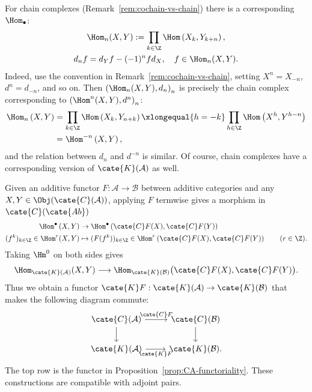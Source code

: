 \begin{remark}
	\label{rem:Hom-chain-cplx}
	For chain complexes (Remark~\ref{rem:cochain-vs-chain}) there is a
	corresponding $\Hom_\bullet$:
	\begin{gather*}
		\Hom_n(X, Y) := \prod_{k \in \Z} \Hom\left(X_k, Y_{k+n} \right), \\
		d_n f = d_Y f - (-1)^n f d_X, \quad f \in \Hom_n(X, Y).
	\end{gather*}
	Indeed, use the convention in Remark~\ref{rem:cochain-vs-chain}, setting
	$X^n=X_{-n}$, $d^n=d_{-n}$, and so on. Then
	$\left(\Hom_n(X,Y),d_n\right)_n$ is precisely the chain complex
	corresponding to $\left(\Hom^n(X,Y),d^n\right)_n$:
	\begin{align*}
		\Hom_n\left(X, Y \right) & = \prod_{k \in \Z} \Hom\left( X_k, Y_{n+k} \right) \xlongequal{h = -k} \prod_{h \in \Z} \Hom\left(X^h, Y^{h-n} \right) \\
		& = \Hom^{-n} \left(X, Y\right),
	\end{align*}
	and the relation between $d_n$ and $d^{-n}$ is similar. Of course, chain
	complexes have a corresponding version of $\cate{K}(\mathcal{A})$ as
	well.
\end{remark}

Given an additive functor $F:\mathcal{A}\to\mathcal{B}$ between additive
categories and any $X,Y\in\Obj(\cate{C}(\mathcal{A}))$, applying $F$
termwise gives a morphism in $\cate{C}(\cate{Ab})$
\begin{align*}
	\Hom^\bullet\left(X, Y\right) & \to \Hom^\bullet\left(\cate{C}F(X), \cate{C}F(Y) \right) \\
	(f^k)_{k \in \Z}\in\Hom^r(X,Y) & \mapsto
	(F(f^k))_{k \in \Z}\in
	\Hom^r\left(\cate{C}F(X),\cate{C}F(Y)\right) \qquad (r\in\Z).
\end{align*}
Taking $\Hm^0$ on both sides gives
\[
	\Hom_{\cate{K}(\mathcal{A})}(X,Y)\longrightarrow
	\Hom_{\cate{K}(\mathcal{B})}
	\bigl(\cate{C}F(X),\cate{C}F(Y)\bigr).
\]
Thus we obtain a functor $\cate{K}F:\cate{K}(\mathcal{A})\to
\cate{K}(\mathcal{B})$ that makes the following diagram commute:
\begin{equation}\label{eqn:KF}\begin{tikzcd}
	\cate{C}(\mathcal{A}) \arrow[r, "{\cate{C}F}"] \arrow[d] & \cate{C}(\mathcal{B}) \arrow[d] \\
	\cate{K}(\mathcal{A}) \arrow[r, "{\cate{K}F}"'] & \cate{K}(\mathcal{B}).
\end{tikzcd}\end{equation}
The top row is the functor in Proposition~\ref{prop:CA-functoriality}. These
constructions are compatible with adjoint pairs.

